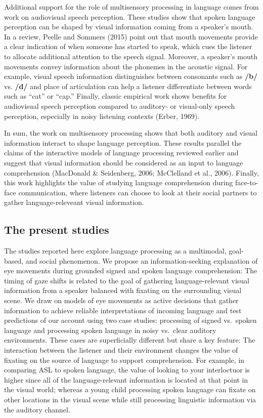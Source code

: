 \documentclass[english,floatsintext,man]{apa6}
\begin{document}
Additional support for the role of multisensory processing in language
comes from work on audiovisual speech perception. These studies show
that spoken language perception can be shaped by visual information
coming from a speaker's mouth. In a review, Peelle and Sommers (2015)
point out that mouth movements provide a clear indication of when
someone has started to speak, which cues the listener to allocate
additional attention to the speech signal. Moreover, a speaker's mouth
movements convey information about the phonemes in the acoustic signal.
For example, visual speech information distinguishes between consonants
such as \textbf{/b/} vs. \textbf{/d/} and place of articulation can help
a listener differentiate between words such as \enquote{cat} or
\enquote{cap.} Finally, classic empirical work shows benefits for
audiovisual speech perception compared to auditory- or visual-only
speech perception, especially in noisy listening contexts (Erber, 1969).

In sum, the work on multisensory processing shows that both auditory and
visual information interact to shape language perception. These results
parallel the claims of the interactive models of language processing
reviewed earlier and suggest that visual information should be
considered as an input to language comprehension (MacDonald \&
Seidenberg, 2006; McClelland et al., 2006). Finally, this work
highlights the value of studying language comprehension during
face-to-face communication, where listeners can choose to look at their
social partners to gather language-releveant visual information.

\hypertarget{the-present-studies}{%
\subsection{The present studies}\label{the-present-studies}}

The studies reported here explore language processing as a multimodal,
goal-based, and social phenomenon. We propose an information-seeking
explanation of eye movements during grounded signed and spoken language
comprehension: The timing of gaze shifts is related to the goal of
gathering language-relevant visual information from a speaker balanced
with fixating on the surrounding visual scene. We draw on models of eye
movements as active decisions that gather information to achieve
reliable interpretations of incoming language and test predictions of
our account using two case studies: processing of signed vs.~spoken
language and processing spoken language in noisy vs.~clear auditory
environments. These cases are superficially different but share a key
feature: The interaction between the listener and their environment
changes the value of fixating on the source of language to support
comprehension. For example, in comparing ASL to spoken language, the
value of looking to your interloctuor is higher since all of the
language-relevant information is located at that point in the visual
world; whereas a young child processing spoken language can fixate on
other locations in the visual scene while still processing linguistic
information via the auditory channel.
\end{document}
